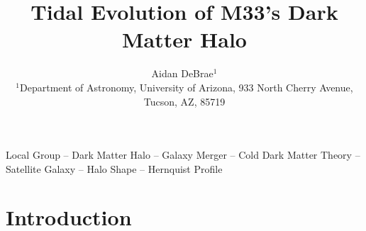 \documentclass[fleqn,usenatbib]{mnras}
\title{Tidal Evolution of M33’s Dark Matter Halo}
\author{
Aidan DeBrae$^{1}$
\\
$^{1}$Department of Astronomy, University of Arizona, 933 North Cherry Avenue, Tucson, AZ, 85719}
\begin{document}
\label{firstpage}
\pagerange{\pageref{firstpage}--\pageref{lastpage}}
\maketitle

\begin{keywords}
Local Group -- Dark Matter Halo -- Galaxy Merger -- Cold Dark Matter Theory -- Satellite Galaxy -- Halo Shape -- Hernquist Profile
\end{keywords}



\section{Introduction}
\end{document}
